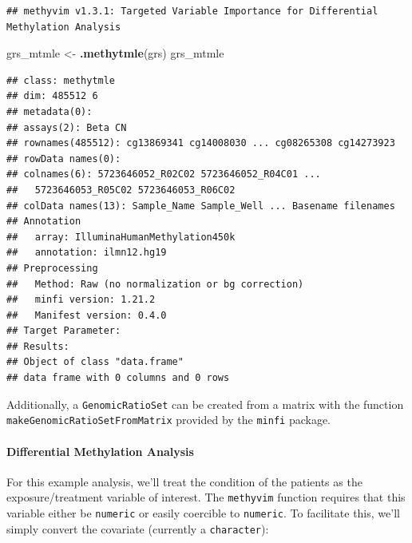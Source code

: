 \documentclass[9pt,a4paper,]{extarticle}
\newenvironment{Shaded}{\begin{snugshade}}{\end{snugshade}}
\newcommand{\DecValTok}[1]{\textcolor[rgb]{0.00,0.00,0.81}{#1}}
\newcommand{\KeywordTok}[1]{\textcolor[rgb]{0.13,0.29,0.53}{\textbf{#1}}}
\newcommand{\NormalTok}[1]{#1}
\newcommand{\OperatorTok}[1]{\textcolor[rgb]{0.81,0.36,0.00}{\textbf{#1}}}
\newcommand{\StringTok}[1]{\textcolor[rgb]{0.31,0.60,0.02}{#1}}
\theoremstyle{definition}
\theoremstyle{definition}
\theoremstyle{definition}
\theoremstyle{remark}
\begin{document}
\begin{verbatim}
## methyvim v1.3.1: Targeted Variable Importance for Differential Methylation Analysis
\end{verbatim}

\begin{Shaded}
\begin{Highlighting}[]
\NormalTok{grs_mtmle <-}\StringTok{ }\KeywordTok{.methytmle}\NormalTok{(grs)}
\NormalTok{grs_mtmle}
\end{Highlighting}
\end{Shaded}

\begin{verbatim}
## class: methytmle 
## dim: 485512 6 
## metadata(0):
## assays(2): Beta CN
## rownames(485512): cg13869341 cg14008030 ... cg08265308 cg14273923
## rowData names(0):
## colnames(6): 5723646052_R02C02 5723646052_R04C01 ...
##   5723646053_R05C02 5723646053_R06C02
## colData names(13): Sample_Name Sample_Well ... Basename filenames
## Annotation
##   array: IlluminaHumanMethylation450k
##   annotation: ilmn12.hg19
## Preprocessing
##   Method: Raw (no normalization or bg correction)
##   minfi version: 1.21.2
##   Manifest version: 0.4.0
## Target Parameter: 
## Results: 
## Object of class "data.frame"
## data frame with 0 columns and 0 rows
\end{verbatim}

Additionally, a \texttt{GenomicRatioSet} can be created from a matrix with the
function \texttt{makeGenomicRatioSetFromMatrix} provided by the \texttt{minfi} package.

\hypertarget{differential-methylation-analysis}{%
\paragraph{Differential Methylation Analysis}\label{differential-methylation-analysis}}

For this example analysis, we'll treat the condition of the patients as the
exposure/treatment variable of interest. The \texttt{methyvim} function requires that
this variable either be \texttt{numeric} or easily coercible to \texttt{numeric}. To
facilitate this, we'll simply convert the covariate (currently a \texttt{character}):

\begin{Shaded}
\end{Shaded}
\end{document}
